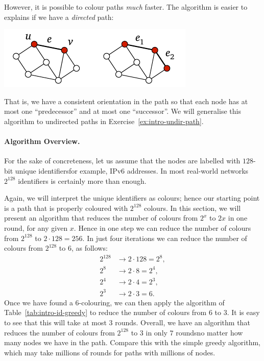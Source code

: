However, it is possible to colour paths \emph{much} faster. The algorithm is easier to explains if we have a \emph{directed} path:
\begin{center}
    \includegraphics[page=\PIntroIdDir]{figs.pdf}
\end{center}
That is, we have a consistent orientation in the path so that each node has at most one ``predecessor'' and at most one ``successor''. We will generalise this algorithm to undirected paths in Exercise~\ref{ex:intro-undir-path}.

\paragraph{Algorithm Overview.}
For the sake of concreteness, let us assume that the nodes are labelled with $128$-bit unique identifiers\mydash for example, IPv6 addresses. In most real-world networks $2^{128}$ identifiers is certainly more than enough.

Again, we will interpret the unique identifiers as colours; hence our starting point is a path that is properly coloured with $2^{128}$ colours. In this section, we will present an algorithm that reduces the number of colours from $2^x$ to $2x$ in one round, for any given $x$. Hence in one step we can reduce the number of colours from $2^{128}$ to $2 \cdot 128 = 256$. In just four iterations we can reduce the number of colours from $2^{128}$ to $6$, as follows:
\begin{align*}
    2^{128} &\to 2 \cdot 128 = 2^8, \\
    2^8 &\to 2 \cdot 8 = 2^4, \\
    2^4 &\to 2 \cdot 4 = 2^3, \\
    2^3 &\to 2 \cdot 3 = 6.
\end{align*}
Once we have found a $6$-colouring, we can then apply the algorithm of Table~\ref{tab:intro-id-greedy} to reduce the number of colours from $6$ to $3$. It is easy to see that this will take at most $3$ rounds. Overall, we have an algorithm that reduces the number of colours from $2^{128}$ to $3$ in only $7$ rounds\mydash no matter how many nodes we have in the path. Compare this with the simple greedy algorithm, which may take millions of rounds for paths with millions of nodes.

